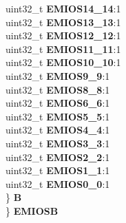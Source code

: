\begin{DoxyCompactItemize}
\begin{tabbing}
\>\>uint32\_t {\bfseries EMIOS14\_14}:1\\
\>\>uint32\_t {\bfseries EMIOS13\_13}:1\\
\>\>uint32\_t {\bfseries EMIOS12\_12}:1\\
\>\>uint32\_t {\bfseries EMIOS11\_11}:1\\
\>\>uint32\_t {\bfseries EMIOS10\_10}:1\\
\>\>uint32\_t {\bfseries EMIOS9\_9}:1\\
\>\>uint32\_t {\bfseries EMIOS8\_8}:1\\
\>\>uint32\_t {\bfseries EMIOS6\_6}:1\\
\>\>uint32\_t {\bfseries EMIOS5\_5}:1\\
\>\>uint32\_t {\bfseries EMIOS4\_4}:1\\
\>\>uint32\_t {\bfseries EMIOS3\_3}:1\\
\>\>uint32\_t {\bfseries EMIOS2\_2}:1\\
\>\>uint32\_t {\bfseries EMIOS1\_1}:1\\
\>\>uint32\_t {\bfseries EMIOS0\_0}:1\\
\>\} {\bfseries B}\\
\} {\bfseries EMIOSB}\\


\end{tabbing}
\end{DoxyCompactItemize}
